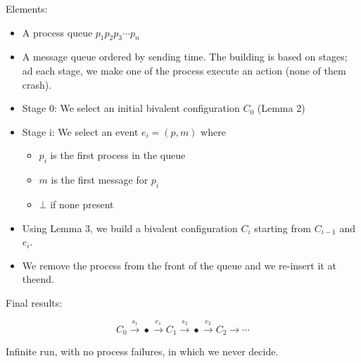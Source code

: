 \documentclass[a4paper,11pt,hidelinks]{article}
\begin{document}
Elements:

\begin{itemize}
    \item A process queue $p_1 p_2 p_3 \cdots p_n$
    \item A message queue ordered by sending time. The building is based on stages; ad each stage, we make one of the process execute an action (none of them crash).
    \item Stage 0: We select an initial bivalent configuration $C_0$ (Lemma 2)
    \item Stage i: We select an event $e_i = (p, m)$ where \begin{itemize}
              \item $p_i$ is the first process in the queue
              \item $m$ is the first message for $p_i$
              \item $\bot$ if none present
          \end{itemize}
    \item Using Lemma 3, we build a bivalent configuration $C_i$ starting from $C_{i−1}$ and $e_i$.
    \item We remove the process from the front of the queue and we re-insert it at theend.
\end{itemize}

Final results:

$$
    C_0 \xrightarrow{s_1} \bullet \xrightarrow{e_1} C_1 \xrightarrow{s_2} \bullet \xrightarrow{e_2} C_2 \rightarrow \cdots
$$

Infinite run, with no process failures, in which we never decide.

\endgroup
\end{document}
